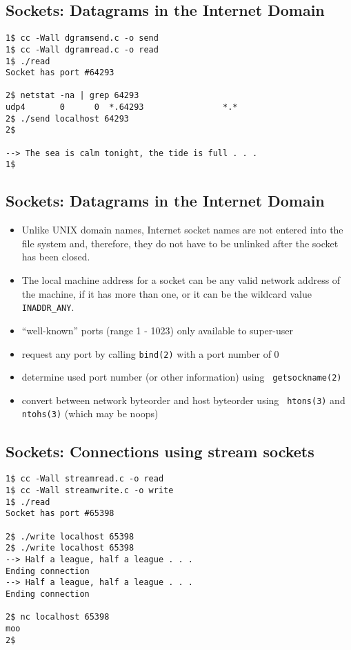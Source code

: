 \documentclass[xga]{xdvislides}
\begin{document}
\subsection{Sockets: Datagrams in the Internet Domain}
\begin{verbatim}
1$ cc -Wall dgramsend.c -o send
1$ cc -Wall dgramread.c -o read
1$ ./read
Socket has port #64293

2$ netstat -na | grep 64293
udp4       0      0  *.64293                *.*
2$ ./send localhost 64293
2$

--> The sea is calm tonight, the tide is full . . .
1$
\end{verbatim}
\vfill

\subsection{Sockets: Datagrams in the Internet Domain}
\begin{itemize}
	\item Unlike UNIX domain names, Internet socket names are not entered into
		the file system and, therefore, they do not have to be unlinked after the
		socket has been closed.
	\item The local machine address for a socket can be any valid network address
		of the machine, if it has more than one, or it can be the wildcard value
		{\tt INADDR\_ANY}.
	\item ``well-known'' ports (range 1 - 1023) only available to super-user
	\item request any port by calling {\tt bind(2)} with a port number of 0
	\item determine used port number (or other information) using {\tt
		getsockname(2)}
	\item convert between network byteorder and host byteorder using {\tt
		htons(3)} and {\tt ntohs(3)} (which may be noops)
\end{itemize}

\subsection{Sockets: Connections using stream sockets}
\begin{verbatim}
1$ cc -Wall streamread.c -o read
1$ cc -Wall streamwrite.c -o write
1$ ./read
Socket has port #65398

2$ ./write localhost 65398
2$ ./write localhost 65398
--> Half a league, half a league . . .
Ending connection
--> Half a league, half a league . . .
Ending connection

2$ nc localhost 65398
moo
2$
\end{verbatim}
\vfill
\end{document}
